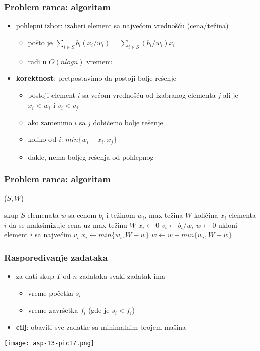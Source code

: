 \documentclass[compress,aspectratio=169]{beamer}
\begin{document}
\begin{frame}[fragile]
  \frametitle{Problem ranca: algoritam}
  \begin{itemize}
    \item pohlepni izbor: izaberi element sa najvećom vrednošću (cena/težina)
    \begin{itemize}
      \item pošto je $\sum_{i\in S}b_{i}(x_{i}/w_{i}) = \sum_{i\in S}(b_{i}/w_{i})x_{i}$
      \item radi u $O(n log n)$ vremenu
    \end{itemize}
    \item \textbf{korektnost}: pretpostavimo da postoji bolje rešenje
    \begin{itemize}
      \item postoji element $i$ sa većom vrednošću od izabranog elementa 
      $j$ ali je $x_{i}<w_{i}$ i $v_{i}<v_{j}$
      \item ako zamenimo $i$ sa $j$ dobićemo bolje rešenje
      \item koliko od $i$: $min\{w_{i}-x_{i},x_{j}\}$
      \item dakle, nema boljeg rešenja od pohlepnog
    \end{itemize}
  \end{itemize}
\end{frame}

\begin{frame}
  \frametitle{Problem ranca: algoritam}
  ($S, W$)
  \begin{algorithmic}
    \REQUIRE skup $S$ elemenata $w$ sa cenom $b_{i}$ i težinom $w_{i}$, max težina $W$
    \ENSURE količina $x_{i}$ elementa $i$ da se maksimizuje cena uz max težinu $W$
      \STATE $x_{i} \leftarrow 0$
      \STATE $v_{i} \leftarrow b_{i} / w_{i}$ 
    \ENDFOR
    \STATE $w \leftarrow 0$ 
      \STATE ukloni element $i$ sa najvećim $v_{i}$
      \STATE $x_{i} \leftarrow min\{w_{i}, W-w\}$
      \STATE $w \leftarrow w + min\{w_{i}, W-w\}$ 
    \ENDWHILE
  \end{algorithmic}    
\end{frame}

\begin{frame}[fragile]
  \frametitle{Raspoređivanje zadataka}
  \begin{itemize}
    \item za dati skup $T$ od $n$ zadataka svaki zadatak ima
    \begin{itemize}
      \item vreme početka $s_{i}$
      \item vreme završetka $f_{i}$ (gde je $s_{i}<f_{i}$)
    \end{itemize}
    \item \textbf{cilj}: obaviti sve zadatke sa minimalnim brojem mašina
  \end{itemize}
  \begin{center}
    \texttt{[image: asp-13-pic17.png]}
  \end{center}
\end{frame}
\end{document}
